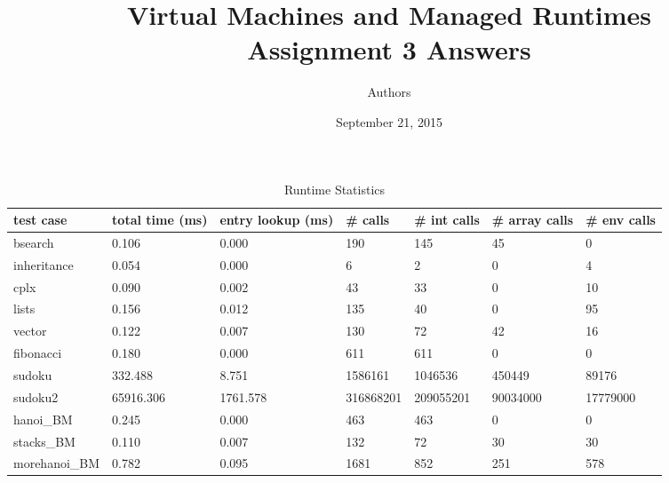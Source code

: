\documentclass[notitlepage]{report}
\title{\vspace{-0.5in}Virtual Machines and Managed Runtimes \\ Assignment 3 Answers}
\date{\vspace{-0.5in}September 21, 2015}
\author{\vspace{-0.5in}Authors\vspace{-0.5in}}
\begin{document}
\maketitle

\begin{table}[!htp]
\centering
\caption{Runtime Statistics}
\label{statistics}
{\footnotesize
\begin{tabular}{lllllll}
\toprule
test case & total time (ms)    & entry lookup (ms) & \# calls & \# int calls & \# array calls & \# env calls \\
\midrule
bsearch        & 0.106          & 0.000          & 190            & 145            & 45             & 0              \\
inheritance    & 0.054          & 0.000          & 6              & 2              & 0              & 4              \\
cplx           & 0.090          & 0.002          & 43             & 33             & 0              & 10             \\
lists          & 0.156          & 0.012          & 135            & 40             & 0              & 95             \\
vector         & 0.122          & 0.007          & 130            & 72             & 42             & 16             \\
fibonacci      & 0.180          & 0.000          & 611            & 611            & 0              & 0              \\
sudoku         & 332.488        & 8.751          & 1586161        & 1046536        & 450449         & 89176          \\
sudoku2        & 65916.306      & 1761.578       & 316868201      & 209055201      & 90034000       & 17779000       \\
hanoi\_BM      & 0.245          & 0.000          & 463            & 463            & 0              & 0              \\
stacks\_BM     & 0.110          & 0.007          & 132            & 72             & 30             & 30             \\
morehanoi\_BM  & 0.782          & 0.095          & 1681           & 852            & 251            & 578            \\
\bottomrule
\end{tabular}
}
\end{table}
\end{document}
